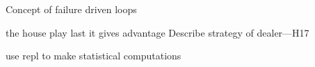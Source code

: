 

Concept of failure driven loops

the house play last it gives advantage
Describe strategy of dealer---H17


use repl to make statistical computations
